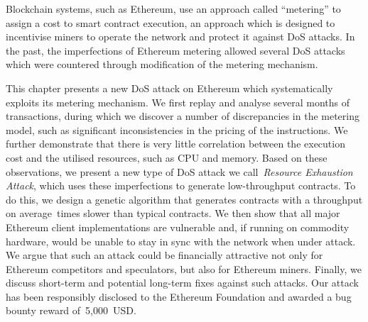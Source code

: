 
  Blockchain systems, such as Ethereum, use an approach called ``metering'' to assign a cost to smart contract execution, an approach which is designed to incentivise miners to operate the network and protect it against DoS attacks. In the past, the imperfections of Ethereum metering allowed several DoS attacks which were countered through modification of the metering mechanism.

  This chapter presents a new DoS attack on Ethereum which systematically exploits its metering mechanism. We first replay and analyse several months of transactions, during which we discover a number of discrepancies in the metering model, such as significant inconsistencies in the pricing of the instructions. We further demonstrate that there is very little correlation between the execution cost and the utilised resources, such as CPU and memory. Based on these observations, we present a new type of DoS attack we call~\emph{Resource Exhaustion Attack}, which uses these imperfections to generate low-throughput contracts. To do this, we design a genetic algorithm that generates contracts with a throughput on average~\Slowdown times slower than typical contracts. We then show that all major Ethereum client implementations are vulnerable and, if running on commodity hardware, would be unable to stay in sync with the network when under attack. We argue that such an attack could be financially attractive not only for Ethereum competitors and speculators, but also for Ethereum miners. Finally, we discuss short-term and potential long-term fixes against such attacks. Our attack has been responsibly disclosed to the Ethereum Foundation and awarded a bug bounty reward of~5,000~USD.
